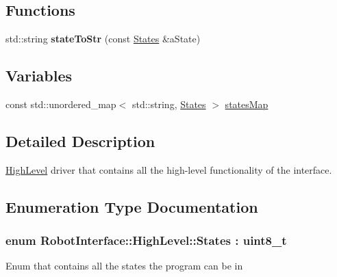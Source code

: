 \subsection*{Functions}
\begin{DoxyCompactItemize}
\item 
std\+::string {\bfseries state\+To\+Str} (const \hyperlink{namespaceRobotInterface_1_1HighLevel_ab7122caf9a0b72cf97d406d33db38a7c}{States} \&a\+State)\hypertarget{namespaceRobotInterface_1_1HighLevel_a594b969ea7a799d997d037837e7971ea}{}\label{namespaceRobotInterface_1_1HighLevel_a594b969ea7a799d997d037837e7971ea}

\end{DoxyCompactItemize}
\subsection*{Variables}
\begin{DoxyCompactItemize}
\item 
const std\+::unordered\+\_\+map$<$ std\+::string, \hyperlink{namespaceRobotInterface_1_1HighLevel_ab7122caf9a0b72cf97d406d33db38a7c}{States} $>$ \hyperlink{namespaceRobotInterface_1_1HighLevel_ac36b1d73c7eca7c1227680406f99c9b2}{states\+Map}
\end{DoxyCompactItemize}


\subsection{Detailed Description}
\hyperlink{namespaceRobotInterface_1_1HighLevel}{High\+Level} driver that contains all the high-\/level functionality of the interface. 

\subsection{Enumeration Type Documentation}
\subsubsection[{\texorpdfstring{States}{States}}]{\setlength{\rightskip}{0pt plus 5cm}enum {\bf Robot\+Interface\+::\+High\+Level\+::\+States} \+: uint8\+\_\+t\hspace{0.3cm}{\ttfamily [strong]}}\hypertarget{namespaceRobotInterface_1_1HighLevel_ab7122caf9a0b72cf97d406d33db38a7c}{}\label{namespaceRobotInterface_1_1HighLevel_ab7122caf9a0b72cf97d406d33db38a7c}
Enum that contains all the states the program can be in 

